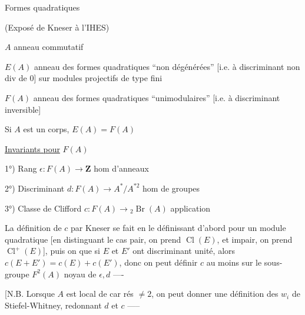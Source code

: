 Formes quadratiques

(Exposé de Kneser à l’IHES)

$A$ anneau commutatif

$E(A)$ anneau des formes quadratiques ``non dégénérées'' [i.e. à discriminant non div de $0$] sur modules projectifs de type fini

$F(A)$ anneau des formes quadratiques ``unimodulaires'' [i.e. à discriminant inversible]

Si $A$ est un corps, $E(A)=F(A)$

\uline{Invariants pour} $F(A)$

1°) Rang \quad $\epsilon:F(A)\longrightarrow\mathbf Z$ \quad hom d’anneaux

2°) Discriminant \quad $d:F(A)\longrightarrow A^*/A^{*2}$ \quad hom de groupes

3°) Classe de Clifford \quad $c:F(A)\longrightarrow{}_2\operatorname{Br}(A)$ \quad application

La définition de $c$ par Kneser se fait en le définissant d’abord pour un module quadratique [en distinguant le cas pair, on prend $\operatorname{Cl}(E)$, et impair, on prend $\operatorname{Cl}^{+}(E)$], puis on  que si $E$ et $E'$ ont  discriminant unité, alors $c(E+E')=c(E)+c(E')$, donc on peut définir $c$ au moins sur le sous-groupe $F^2(A)$ noyau de $\epsilon,d$ ----

[N.B. Lorsque $A$ est local de car rés $\neq2$, on peut donner une définition des $w_i$ de Stiefel-Whitney, redonnant $d$ et $c$ -----
